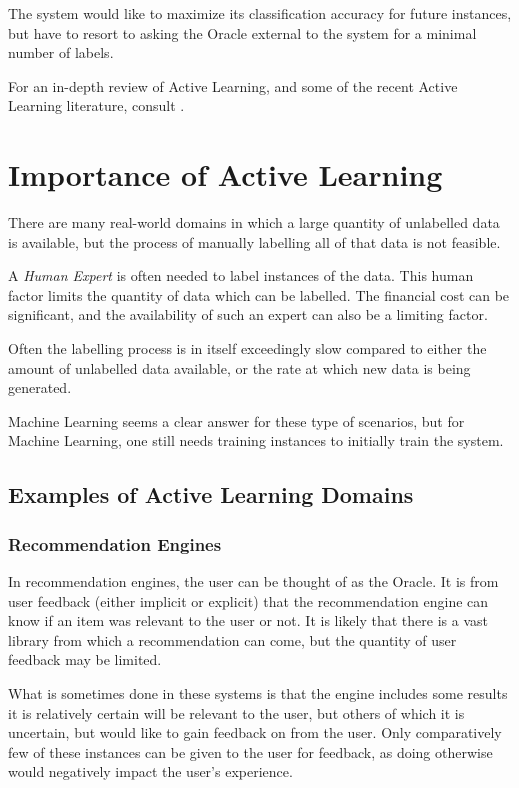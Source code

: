 \documentclass[a4paper,11pt]{report}
\begin{document}
The system would like to maximize its classification accuracy for future instances, but have to resort to asking the Oracle external to the system for a minimal number of labels.

For an in-depth review of Active Learning, and some of the recent Active Learning literature, consult \citep{Settles2010}.

\section{Importance of Active Learning}
There are many real-world domains in which a large quantity of unlabelled data is available, but the process of manually labelling all of that data is not feasible. 

A \emph{Human Expert} is often needed to label instances of the data. This human factor limits the quantity of data which can be labelled. The financial cost can be significant, and the availability of such an expert can also be a limiting factor.

Often the labelling process is in itself exceedingly slow compared to either the amount of unlabelled data available, or the rate at which new data is being generated. 

Machine Learning seems a clear answer for these type of scenarios, but for Machine Learning, one still needs training instances to initially train the system.

\subsection{Examples of Active Learning Domains}
\subsubsection{Recommendation Engines}
In recommendation engines, the user can be thought of as the Oracle. It is from user feedback (either implicit or explicit) that the recommendation engine can know if an item was relevant to the user or not. It is likely that there is a vast library from which a recommendation can come, but the quantity of user feedback may be limited.

What is sometimes done in these systems is that the engine includes some results it is relatively certain will be relevant to the user, but others of which it is uncertain, but would like to gain feedback on from the user. Only comparatively few of these instances can be given to the user for feedback, as doing otherwise would negatively impact the user's experience.
\end{document}
